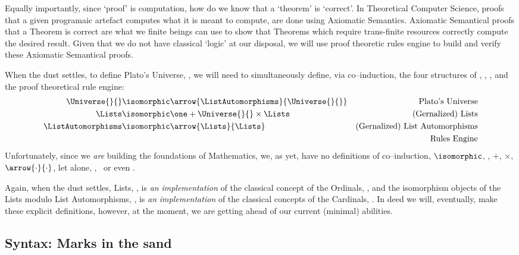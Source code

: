 \documentclass[a4paper,openany]{amsbook}
\begin{document}
Equally importantly, since `proof' is computation, how do we know that a `theorem' is
`correct'. In Theoretical Computer Science, proofs that a given programaic artefact
computes what it is meant to compute, are done using Axiomatic Semantics. Axiomatic
Semantical proofs that a Theorem is correct are what we finite beings can use to show that
Theorems which require trans-finite resources correctly compute the desired result. Given
that we do not have classical `logic' at our disposal, we will use proof theoretic rules
engine to build and verify these Axiomatic Semantical proofs.

When the dust settles, to define Plato's Universe, \Universe{}{}, we will need to
simultaneously define, via co--induction, the four structures of \Universe{}{},
\Lists, \ListAutomorphisms, and the proof theoretical rule engine:
%
\begin{align}
   \Universe{}{}          & \isomorphic \arrow{\ListAutomorphisms}{\Universe{}{}} & 
   \text{Plato's Universe} \\
   \Lists             & \isomorphic \one + \Universe{}{} \times \Lists        & 
   \text{(Gernalized) Lists} \\
   \ListAutomorphisms & \isomorphic \arrow{\Lists}{\Lists}                & 
   \text{(Gernalized) List Automorphisms} \\
    &  & \text{Rules Engine}
\end{align}
%
Unfortunately, since we \emph{are} building the foundations of Mathematics, we,
as yet, have no definitions of co--induction, $\isomorphic$, \one, $+$, $\times$,
$\arrow{\cdot}{\cdot}$, let alone, \Universe{}{}, \Lists\ or even \ListAutomorphisms.

Again, when the dust settles, Lists, \Lists, is \emph{an} \emph{implementation}
of the classical concept of the Ordinals, \Ordinal, and the isomorphism objects
of the Lists modulo List Automorphisms, \ListAutomorphisms, is \emph{an}
\emph{implementation} of the classical concepts of the Cardinals, \Cardinal. In
deed we will, eventually, make these explicit definitions, however, at the
moment, we are getting ahead of our current (minimal) abilities.

\subsection{Syntax: Marks in the sand}
\end{document}
